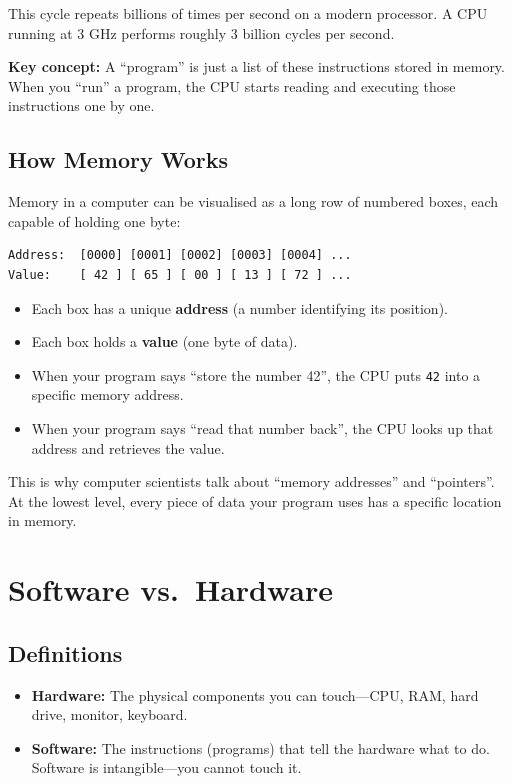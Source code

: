 \documentclass[12pt, a4paper, oneside]{book}
\begin{document}
This cycle repeats billions of times per second on a modern processor. A CPU running at 3 GHz performs roughly 3 billion cycles per second.

\textbf{Key concept:} A ``program'' is just a list of these instructions stored in memory. When you ``run'' a program, the CPU starts reading and executing those instructions one by one.

\subsection{How Memory Works}

Memory in a computer can be visualised as a long row of numbered boxes, each capable of holding one byte:

\begin{verbatim}
Address:  [0000] [0001] [0002] [0003] [0004] ...
Value:    [ 42 ] [ 65 ] [ 00 ] [ 13 ] [ 72 ] ...
\end{verbatim}

\begin{itemize}[leftmargin=2em]
    \item Each box has a unique \textbf{address} (a number identifying its position).
    \item Each box holds a \textbf{value} (one byte of data).
    \item When your program says ``store the number 42'', the CPU puts \texttt{42} into a specific memory address.
    \item When your program says ``read that number back'', the CPU looks up that address and retrieves the value.
\end{itemize}

This is why computer scientists talk about ``memory addresses'' and ``pointers''. At the lowest level, every piece of data your program uses has a specific location in memory.

\section{Software vs.\ Hardware}

\subsection{Definitions}

\begin{itemize}[leftmargin=2em]
    \item \textbf{Hardware:} The physical components you can touch---CPU, RAM, hard drive, monitor, keyboard.
    \item \textbf{Software:} The instructions (programs) that tell the hardware what to do. Software is intangible---you cannot touch it.
\end{itemize}
\end{document}
